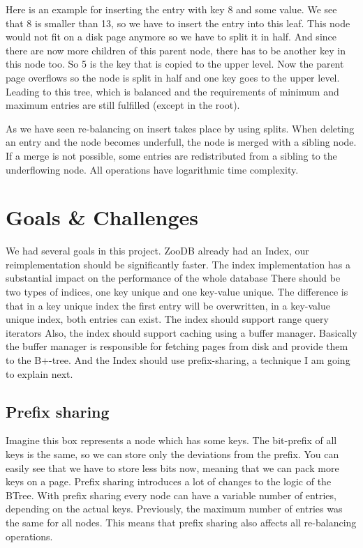 \documentclass[11pt,a4paper,oneside]{article}
\begin{document}
 Here is an example for inserting the entry with key 8 and some value. We see that 8 is smaller than 13, so we have to insert the entry into this leaf. This node would not fit on a disk page anymore so we have to split it in half.
 And since there are now more children of this parent node, there has to be another key in this node too. So 5 is the key that is copied to the upper level.
 Now the parent page overflows so the node is split in half and one key goes to the upper level. 
 Leading to this tree, which is balanced and the requirements of minimum and maximum entries are still fulfilled (except in the root).

 As we have seen re-balancing on insert takes place by using splits. When deleting an entry and the node becomes underfull, the node is merged with a sibling node. If a merge is not possible, some entries are redistributed from a sibling to the underflowing node.
 All operations have logarithmic time complexity.


\section{Goals \& Challenges}
 We had several goals in this project.
 ZooDB already had an Index, our reimplementation should be significantly faster. The index implementation has a substantial impact on the performance of the whole database
 There should be two types of indices, one key unique and one key-value unique. 
   The difference is that in a key unique index the first entry will be overwritten, in a key-value unique index, both entries can exist. 
 The index should support range query iterators
 Also, the index should support caching using a buffer manager. Basically the buffer manager is responsible for fetching pages from disk and provide them to the B+-tree.
 And the Index should use prefix-sharing, a technique I am going to explain next.

\subsection{Prefix sharing}
 Imagine this box represents a node which has some keys. 
 The bit-prefix of all keys is the same, so we can store only the deviations from the prefix.
 You can easily see that we have to store less bits now, meaning that we can pack more keys on a page.
 Prefix sharing introduces a lot of changes to the logic of the BTree. With prefix sharing every node can have a variable number of entries, depending on the actual keys. Previously, the maximum number of entries was the same for all nodes. This means that prefix sharing also affects all re-balancing operations.
\end{document}
